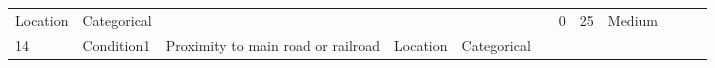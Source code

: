 \documentclass[11pt]{article}
\begin{document}
\begin{longtable}[]{@{}llllllllllll@{}}
\begin{minipage}[t]{0.04\columnwidth}
Location\strut
\end{minipage} & \begin{minipage}[t]{0.04\columnwidth}\raggedright\strut
Categorical\strut
\end{minipage} & \begin{minipage}[t]{0.04\columnwidth}\raggedright\strut
\strut
\end{minipage} & \begin{minipage}[t]{0.04\columnwidth}\raggedright\strut
\strut
\end{minipage} & \begin{minipage}[t]{0.04\columnwidth}\raggedright\strut
\strut
\end{minipage} & \begin{minipage}[t]{0.04\columnwidth}\raggedright\strut
\strut
\end{minipage} & \begin{minipage}[t]{0.04\columnwidth}\raggedright\strut
0\strut
\end{minipage} & \begin{minipage}[t]{0.04\columnwidth}\raggedright\strut
25\strut
\end{minipage} & \begin{minipage}[t]{0.04\columnwidth}\raggedright\strut
Medium\strut
\end{minipage}\tabularnewline
\begin{minipage}[t]{0.04\columnwidth}\raggedright\strut
14\strut
\end{minipage} & \begin{minipage}[t]{0.04\columnwidth}\raggedright\strut
Condition1\strut
\end{minipage} & \begin{minipage}[t]{0.04\columnwidth}\raggedright\strut
Proximity to main road or railroad\strut
\end{minipage} & \begin{minipage}[t]{0.04\columnwidth}\raggedright\strut
Location\strut
\end{minipage} & \begin{minipage}[t]{0.04\columnwidth}\raggedright\strut
Categorical\strut
\end{minipage} & \begin{minipage}[t]{0.04\columnwidth}\raggedright\strut
\strut
\end{minipage} & \begin{minipage}[t]{0.04\columnwidth}\raggedright\strut
\strut
\end{minipage} & \begin{minipage}[t]{0.04\columnwidth}\raggedright\strut

\end{minipage}
\end{longtable}
\end{document}
